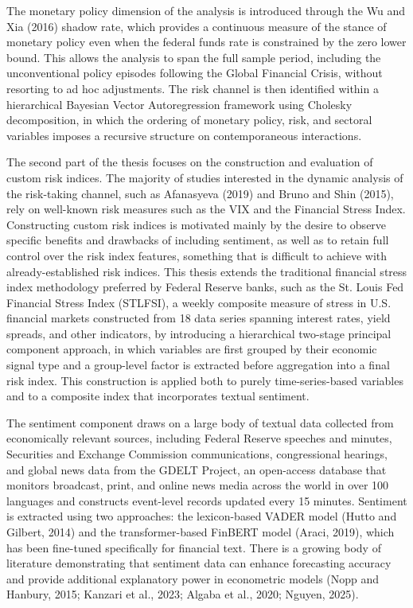 \documentclass[12pt,a4paper]{report}\usepackage[a4paper, top=2.5cm, bottom=2.5cm, left=2.5cm, right=2.5cm]{geometry}
\begin{document}
The monetary policy dimension of the analysis is introduced through the Wu and Xia 
(2016) shadow rate, which provides a continuous measure of the stance of monetary 
policy even when the federal funds rate is constrained by the zero lower bound. This 
allows the analysis to span the full sample period, including the unconventional policy 
episodes following the Global Financial Crisis, without resorting to ad hoc adjustments. 
The risk channel is then identified within a hierarchical Bayesian Vector Autoregression 
framework using Cholesky decomposition, in which the ordering of monetary policy, risk, 
and sectoral variables imposes a recursive structure on contemporaneous interactions.

The second part of the thesis focuses on the construction and evaluation of custom risk indices. The majority of studies interested in the dynamic analysis of the risk-taking channel, such as Afanasyeva (2019) and Bruno and Shin (2015), rely on well-known risk measures such as the VIX and the Financial Stress Index. Constructing custom risk indices is motivated mainly by the desire to observe specific benefits and drawbacks of including sentiment, as well as to retain full control over the risk index features, something that is difficult to achieve with already-established risk indices. This thesis extends the traditional financial stress index methodology preferred by Federal Reserve banks, such as the St. Louis Fed Financial Stress Index (STLFSI), a weekly composite measure of stress in U.S. financial markets constructed from 18 data series spanning interest rates, yield spreads, and other indicators, by introducing a hierarchical two-stage principal component approach, in which variables are first grouped by their economic signal type and a group-level factor is extracted before aggregation into a final risk index. This construction is applied both to purely time-series-based variables and to a composite index that incorporates textual sentiment. 

The sentiment component draws on a large body of textual data collected from economically relevant sources, including Federal Reserve speeches and minutes, Securities and Exchange Commission communications, congressional hearings, and global news data from the GDELT Project, an open-access database that monitors broadcast, print, and online news media across the world in over 100 languages and constructs event-level records updated every 15 minutes. Sentiment is extracted using two approaches: the lexicon-based VADER model (Hutto and Gilbert, 2014) and the transformer-based FinBERT model (Araci, 2019), which has been fine-tuned specifically for financial text. There is a growing body of literature demonstrating that sentiment data can enhance forecasting accuracy and provide additional explanatory power in econometric models (Nopp and Hanbury, 2015; Kanzari et al., 2023; Algaba et al., 2020; Nguyen, 2025). 
\end{document}
